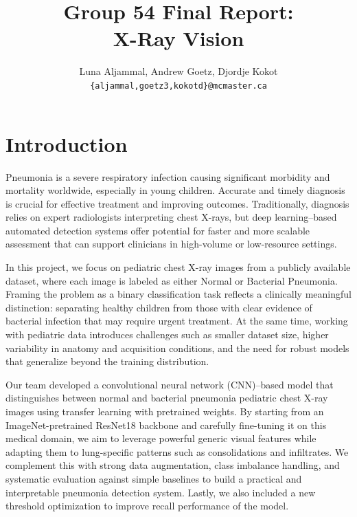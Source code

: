 \documentclass[11pt]{article}
\title{Group 54 Final Report:\\X-Ray Vision}
\author{Luna Aljammal, Andrew Goetz, Djordje Kokot \\
  \texttt{\{aljammal,goetz3,kokotd\}@mcmaster.ca} }
\begin{document}
\maketitle

\section{Introduction}

Pneumonia is a severe respiratory infection causing significant morbidity and mortality worldwide, especially in young children. Accurate and timely diagnosis is crucial for effective treatment and 
improving outcomes. Traditionally, diagnosis relies on expert radiologists interpreting chest X-rays, but deep learning–based automated detection systems offer potential for faster and more scalable assessment that can support clinicians in high-volume or low-resource settings.

In this project, we focus on pediatric chest X-ray images from a publicly available dataset, where each image is labeled as either Normal or Bacterial Pneumonia. Framing the problem as a binary classification task reflects a clinically meaningful distinction: separating healthy children from those with clear evidence of bacterial infection that may require urgent treatment. At the same time, working with pediatric data introduces challenges such as smaller dataset size, higher variability in anatomy and acquisition conditions, and the need for robust models that generalize beyond the training distribution.

Our team developed a convolutional neural network (CNN)–based model that distinguishes between normal and bacterial pneumonia pediatric chest X-ray images using transfer learning with pretrained weights. By starting from an ImageNet-pretrained ResNet18 backbone and carefully fine-tuning it on this medical domain, we aim to leverage powerful generic visual features while adapting them to lung-specific patterns such as consolidations and infiltrates. We complement this with strong data augmentation, class imbalance handling, and systematic evaluation against simple baselines to build a practical and interpretable pneumonia detection system. Lastly, we also included a new threshold optimization to improve recall performance of the model.
\end{document}
